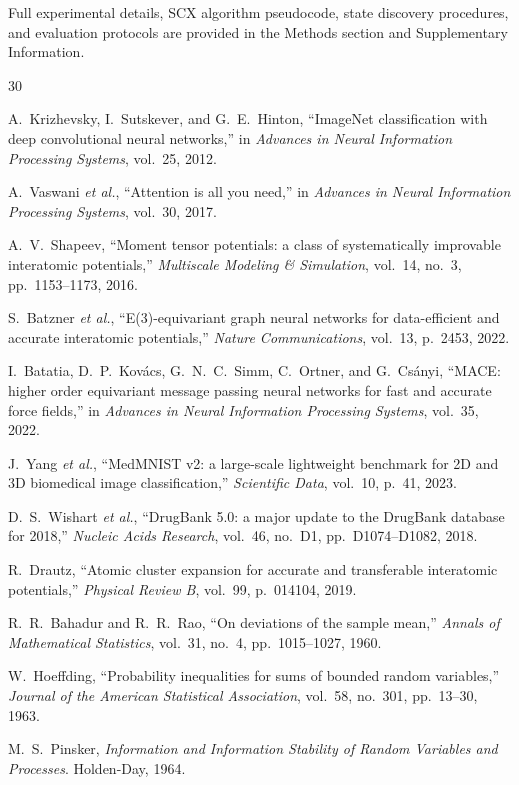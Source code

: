 \begin{methods}
Full experimental details, SCX algorithm pseudocode, state discovery procedures, and evaluation protocols are provided in the Methods section and Supplementary Information.
\end{methods}

\begin{flushleft}
\end{flushleft}

\begin{thebibliography}{30}

A.~Krizhevsky, I.~Sutskever, and G.~E.~Hinton, ``ImageNet classification with deep convolutional neural networks,'' in \textit{Advances in Neural Information Processing Systems}, vol.~25, 2012.

A.~Vaswani \textit{et al.}, ``Attention is all you need,'' in \textit{Advances in Neural Information Processing Systems}, vol.~30, 2017.

A.~V.~Shapeev, ``Moment tensor potentials: a class of systematically improvable interatomic potentials,'' \textit{Multiscale Modeling \& Simulation}, vol.~14, no.~3, pp.~1153--1173, 2016.

S.~Batzner \textit{et al.}, ``E(3)-equivariant graph neural networks for data-efficient and accurate interatomic potentials,'' \textit{Nature Communications}, vol.~13, p.~2453, 2022.

I.~Batatia, D.~P.~Kov\'acs, G.~N.~C.~Simm, C.~Ortner, and G.~Cs\'anyi, ``MACE: higher order equivariant message passing neural networks for fast and accurate force fields,'' in \textit{Advances in Neural Information Processing Systems}, vol.~35, 2022.

J.~Yang \textit{et al.}, ``MedMNIST v2: a large-scale lightweight benchmark for 2D and 3D biomedical image classification,'' \textit{Scientific Data}, vol.~10, p.~41, 2023.

D.~S.~Wishart \textit{et al.}, ``DrugBank 5.0: a major update to the DrugBank database for 2018,'' \textit{Nucleic Acids Research}, vol.~46, no.~D1, pp.~D1074--D1082, 2018.

R.~Drautz, ``Atomic cluster expansion for accurate and transferable interatomic potentials,'' \textit{Physical Review B}, vol.~99, p.~014104, 2019.

R.~R.~Bahadur and R.~R.~Rao, ``On deviations of the sample mean,'' \textit{Annals of Mathematical Statistics}, vol.~31, no.~4, pp.~1015--1027, 1960.

W.~Hoeffding, ``Probability inequalities for sums of bounded random variables,'' \textit{Journal of the American Statistical Association}, vol.~58, no.~301, pp.~13--30, 1963.

M.~S.~Pinsker, \textit{Information and Information Stability of Random Variables and Processes}. Holden-Day, 1964.

\end{thebibliography}

